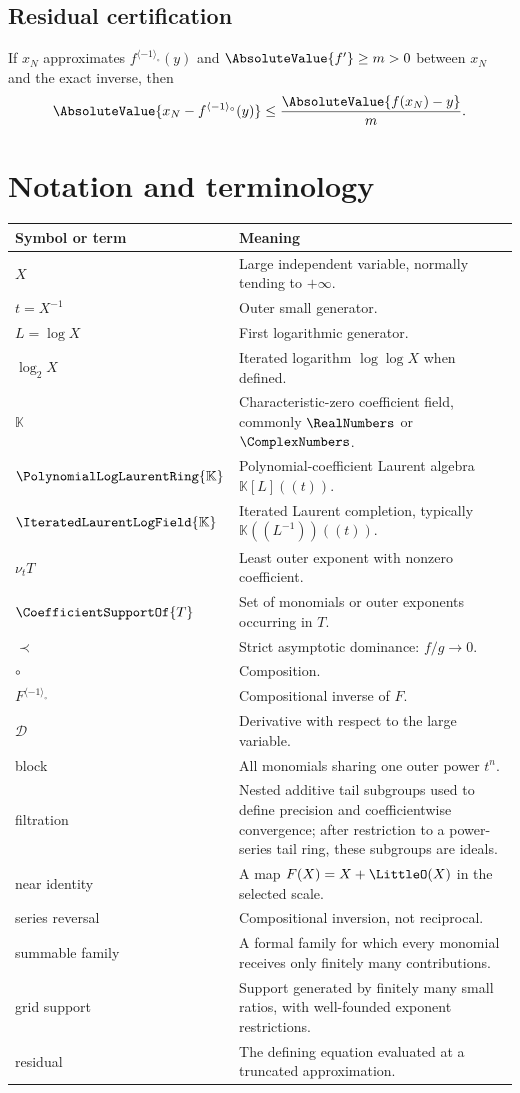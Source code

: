 \documentclass[11pt,oneside]{book}
\theoremstyle{definition}
\theoremstyle{remark}
\newcommand{\K}{\mathbb K}
\newcommand{\PLpoly}{\PolynomialLogLaurentRing{\K}}
\newcommand{\PLfield}{\IteratedLaurentLogField{\K}}
\newcommand{\D}{\mathcal D}
\newcommand{\precdom}{\prec}
\newcommand{\compinv}{^{\langle-1\rangle_{\circ}}}
\newcommand{\compose}{\mathbin{\circ}}
\begin{document}
\section*{Residual certification}
If $x_N$ approximates $f\compinv(y)$ and
$\AbsoluteValue{f'}\ge m>0$ between $x_N$ and the exact inverse, then
\[
 \AbsoluteValue{x_N-f\compinv(y)}
 \le\frac{\AbsoluteValue{f(x_N)-y}}{m}.
\]

\chapter{Notation and terminology}
\label{app:notation}

\begin{longtable}{@{}p{}p{}@{}}
\toprule
Symbol or term&Meaning\\
\midrule
$X$&Large independent variable, normally tending to $+\infty$.\\
$t=X^{-1}$&Outer small generator.\\
$L=\log X$&First logarithmic generator.\\
$\log_2X$&Iterated logarithm $\log\log X$ when defined.\\
$\K$&Characteristic-zero coefficient field, commonly $\RealNumbers$ or $\ComplexNumbers$.\\
$\PLpoly$&Polynomial-coefficient Laurent algebra $\K[L]((t))$.\\
$\PLfield$&Iterated Laurent completion, typically
$\K((L^{-1}))((t))$.\\
$\nu_tT$&Least outer exponent with nonzero coefficient.\\
$\CoefficientSupportOf{T}$&Set of monomials or outer exponents occurring in $T$.\\
$\precdom$&Strict asymptotic dominance: $f/g\to0$.\\
$\compose$&Composition.\\
$F\compinv$&Compositional inverse of $F$.\\
$\D$&Derivative with respect to the large variable.\\
block&All monomials sharing one outer power $t^n$.\\
filtration&Nested additive tail subgroups used to define precision and
coefficientwise convergence; after restriction to a power-series tail ring,
these subgroups are ideals.\\
near identity&A map $F(X)=X+\LittleO(X)$ in the selected scale.\\
series reversal&Compositional inversion, not reciprocal.\\
summable family&A formal family for which every monomial receives only
finitely many contributions.\\
grid support&Support generated by finitely many small ratios, with
well-founded exponent restrictions.\\
residual&The defining equation evaluated at a truncated approximation.\\
\bottomrule
\end{longtable}
\end{document}
